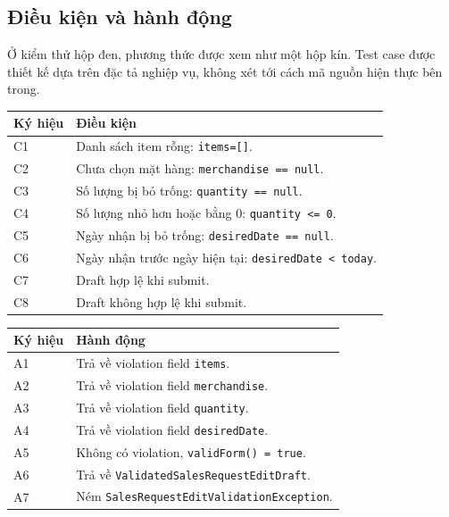 \documentclass[12pt,a4paper]{article}
\newcommand{\code}[1]{\texttt{#1}}
\begin{document}
\subsection{Điều kiện và hành động}

Ở kiểm thử hộp đen, phương thức được xem như một hộp kín. Test case được thiết kế dựa trên đặc tả nghiệp vụ, không xét tới cách mã nguồn hiện thực bên trong.

\begin{longtable}{p{}p{}}
\toprule
\textbf{Ký hiệu} & \textbf{Điều kiện}\\
\midrule
C1 & Danh sách item rỗng: \code{items=[]}.\\
C2 & Chưa chọn mặt hàng: \code{merchandise == null}.\\
C3 & Số lượng bị bỏ trống: \code{quantity == null}.\\
C4 & Số lượng nhỏ hơn hoặc bằng 0: \code{quantity <= 0}.\\
C5 & Ngày nhận bị bỏ trống: \code{desiredDate == null}.\\
C6 & Ngày nhận trước ngày hiện tại: \code{desiredDate < today}.\\
C7 & Draft hợp lệ khi submit.\\
C8 & Draft không hợp lệ khi submit.\\
\bottomrule
\end{longtable}

\begin{longtable}{p{}p{}}
\toprule
\textbf{Ký hiệu} & \textbf{Hành động}\\
\midrule
A1 & Trả về violation field \code{items}.\\
A2 & Trả về violation field \code{merchandise}.\\
A3 & Trả về violation field \code{quantity}.\\
A4 & Trả về violation field \code{desiredDate}.\\
A5 & Không có violation, \code{validForm() = true}.\\
A6 & Trả về \code{ValidatedSalesRequestEditDraft}.\\
A7 & Ném \code{SalesRequestEditValidationException}.\\
\bottomrule
\end{longtable}
\end{document}
